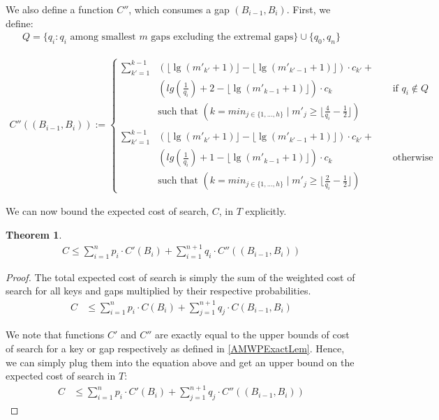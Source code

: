 \documentclass[letterpaper,12pt,titlepage,oneside,final]{book}
\theoremstyle{plain}
\newtheorem{thm}{Theorem}[section]
\begin{document}
We also define a function $C''$, which consumes a gap $(B_{i-1},B_i)$. First, we define:
\begin{align*}
Q = \{q_i : q_i \text{ among smallest }m \text{ gaps excluding the extremal gaps} \} \cup \{q_0, q_n\}
\end{align*}

\begin{align*}
C''((B_{i-1},B_i)) :=
\begin{cases}
\sum_{k'=1}^{k-1} &\left(\lfloor \lg(m'_{k'}+1) \rfloor - \lfloor \lg(m'_{k'-1}+1) \rfloor \right)\cdot c_{k'} + \\
 &\left(lg(\frac{1}{q_i}) + 2 - \lfloor \lg(m'_{k-1}+1) \rfloor \right)\cdot c_k \hspace{70pt} \text{ if } q_i \not\in Q \\
&\text{such that } \left( k=min_{j \in \{1, ..., h\}} \mid m'_j \geq \lfloor \frac{4}{q_i}-\frac{1}{2} \rfloor \right) \\ \\
\sum_{k'=1}^{k-1} &\left(\lfloor \lg(m'_{k'}+1) \rfloor - \lfloor \lg(m'_{k'-1}+1) \rfloor \right)\cdot c_{k'}+ \\
&\left(lg(\frac{1}{q_i}) + 1 - \lfloor \lg(m'_{k-1}+1) \rfloor \right)\cdot c_k \hspace{70pt} \text{ otherwise}\\
&\text{such that } \left( k=min_{j \in \{1, ..., h\}} \mid m'_j \geq \lfloor \frac{2}{q_i}-\frac{1}{2} \rfloor \right)
\end{cases}
\end{align*}

We can now bound the expected cost of search, $C$, in $T$ explicitly.

\begin{thm} \label{ExactApproxMWPagingThm}
\begin{align*}
C \leq \sum_{i=1}^{n} p_i\cdot  C'(B_i) + \sum_{i=1}^{n+1} q_i\cdot C''((B_{i-1},B_i)) 
\end{align*}

\end{thm}

\begin{proof}
The total expected cost of search is simply the sum of the weighted cost of search for all keys and gaps multiplied by their respective probabilities.
\begin{align*}
C &\leq \sum_{i=1}^{n} p_i\cdot C(B_i) + \sum_{j=1}^{n+1} q_j\cdot C(B_{i-1},B_i) 
\end{align*}

We note that functions $C'$ and $C''$ are exactly equal to the upper bounds of cost of search for a key or gap respectively as defined in \ref{AMWPExactLem}. Hence, we can simply plug them into the equation above and get an upper bound on the expected cost of search in $T$:
\begin{align*}
C &\leq \sum_{i=1}^{n} p_i\cdot C'(B_i) + \sum_{j=1}^{n+1} q_j\cdot C''((B_{i-1},B_i))
\end{align*}


\end{proof}
\end{document}
